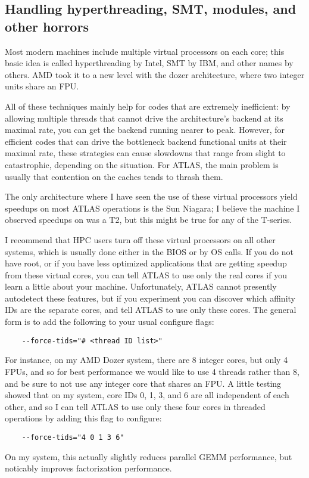\documentclass[11pt]{article}
\begin{document}
\clearpage
\subsection{Handling hyperthreading, SMT, modules, and other horrors}
Most modern machines include multiple virtual processors on each core;
this basic idea is called hyperthreading by Intel, SMT by IBM, and other
names by others.  AMD took it to a new level with the dozer architecture,
where two integer units share an FPU.

All of these techniques mainly help for codes that are extremely inefficient:
by allowing multiple threads that cannot drive the architecture's backend at 
its maximal rate, you can get the backend running nearer to peak.  However,
for efficient codes that can drive the bottleneck backend functional units
at their maximal rate, these strategies can cause slowdowns that range
from slight to catastrophic, depending on the situation.  For ATLAS,
the main problem is usually that contention on the caches tends to thrash
them.

The only architecture where I have seen the use of these virtual processors
yield speedups on most ATLAS operations is the Sun Niagara;  I believe the
machine I observed speedups on was a T2, but this might be true for any
of the T-series.

I recommend that HPC users turn off these virtual processors on all other
systems, which is usually done either in the BIOS or by OS calls.  If
you do not have root, or if you have less optimized applications that are
getting speedup from these virtual cores, you can tell ATLAS to use only
the real cores if you learn a little about your machine.  Unfortunately,
ATLAS cannot presently autodetect these features, but if you experiment
you can discover which affinity IDs are the separate cores, and tell
ATLAS to use only these cores.  The general form is to add the following
to your usual configure flags:
\begin{verbatim}
    --force-tids="# <thread ID list>"
\end{verbatim}

For instance, on my AMD Dozer system,
there are 8 integer cores, but only 4 FPUs, and so for best performance we
would like to use 4 threads rather than 8, and be sure to not use any
integer core that shares an FPU.  A little testing showed that on my
system, core IDs 0, 1, 3, and 6 are all independent of each other, and so
I can tell ATLAS to use only these four cores in threaded operations by
adding this flag to configure:
\begin{verbatim}
    --force-tids="4 0 1 3 6"
\end{verbatim}
On my system, this actually slightly reduces parallel GEMM performance, but
noticably improves factorization performance.
\end{document}

